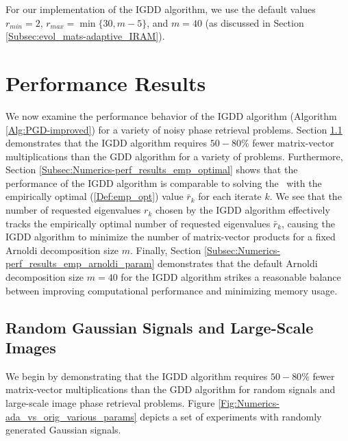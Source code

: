 For our implementation of the IGDD algorithm, we use the default values $r_{min}=2$, $r_{max} = \min\{ 30, m-5 \}$, and $m=40$ (as discussed in Section \ref{Subsec:evol_mats-adaptive_IRAM}).




\section{Performance Results} 		\label{Subsec:Numerics-perf_results}


We now examine the performance behavior of the IGDD algorithm (Algorithm \ref{Alg:PGD-improved}) for a variety of noisy phase retrieval problems.
Section \ref{Subsec:Numerics-perf_results_random} demonstrates that the IGDD algorithm requires $50-80\%$ fewer matrix-vector multiplications than the GDD algorithm for a variety of problems.
Furthermore, Section \ref{Subsec:Numerics-perf_results_emp_optimal} shows that the performance of the IGDD algorithm is comparable to solving the \emep \ with the empirically optimal (\ref{Def:emp_opt}) value $\bar{r}_k$ for each iterate $k$.
We see that the number of requested eigenvalues $r_k$ chosen by the IGDD algorithm effectively tracks the empirically optimal number of requested eigenvalues $\bar{r}_k$, causing the IGDD algorithm to minimize the number of matrix-vector products for a fixed Arnoldi decomposition size $m$.
Finally, Section \ref{Subsec:Numerics-perf_results_emp_arnoldi_param} demonstrates that the default Arnoldi decomposition size $m=40$ for the IGDD algorithm strikes a reasonable balance between improving computational performance and minimizing memory usage.




\subsection{Random Gaussian Signals and Large-Scale Images}	\label{Subsec:Numerics-perf_results_random}

We begin by demonstrating that the IGDD algorithm requires $50-80\%$ fewer matrix-vector multiplications than the GDD algorithm for random signals and large-scale image phase retrieval problems.
Figure \ref{Fig:Numerics-ada_vs_orig_various_params} depicts a set of experiments with randomly generated Gaussian signals.


